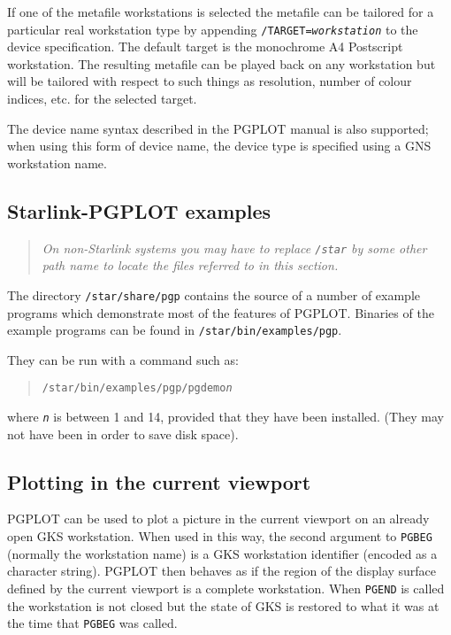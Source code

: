 \documentclass[twoside,11pt]{article}
\newcommand{\xref}[3]{#1}
\newcommand{\xlabel}[1]{}
\renewcommand{\_}{\texttt{\symbol{95}}}
\begin{document}
If one of the metafile workstations is selected the metafile can be
tailored for a particular real workstation type by appending
\texttt{/TARGET=\emph{workstation}} to the device specification.  The
default target is the monochrome A4 Postscript workstation. The
resulting metafile can be played back on any workstation but will be
tailored with respect to such things as resolution, number of colour
indices, etc. for the selected target.

The device name syntax described in the PGPLOT manual is also
supported; when using this form of device name, the device type is
specified using a GNS workstation name.

\subsection{\xlabel{starlink-pgplot_examples}Starlink-PGPLOT examples}
\label{starlink-pgplot_examples}

\begin{quote}
\emph{ On non-Starlink systems you may have to replace \texttt{/star} by
some other path name to locate the files referred to in this section.}
\end{quote}

The directory \texttt{/star/share/pgp} contains the source of a
number of example programs which demonstrate most of the features of
PGPLOT.  Binaries of the example programs can be found in
\texttt{/star/bin/examples/pgp}.

They can be run with a command such as:

\begin{quote}
\texttt{/star/bin/examples/pgp/pgdemo{\emph{n}}}
\end{quote}

where \texttt{\emph{n}} is between 1 and 14, provided that they have
been installed.  (They may not have been in order to save disk space).

\subsection{\xlabel{plotting_in_the_current_viewport} %
Plotting in the current viewport}
\label{plotting_in_the_current_viewport}
\label{viewport}

PGPLOT can be used to plot a picture in the current viewport on an
already open GKS workstation. When used in this way, the second
argument to \xref{\texttt{PGBEG}}{sun15}{PGBEG} (normally the workstation
name) is a GKS workstation identifier (encoded as a character string).
PGPLOT then behaves as if the region of the display surface defined by
the current viewport is a complete workstation.  When
\xref{\texttt{PGEND}}{sun15}{PGEND} is called the workstation is not closed
but the state of GKS is restored to what it was at the time that
\texttt{PGBEG} was called.
\end{document}
